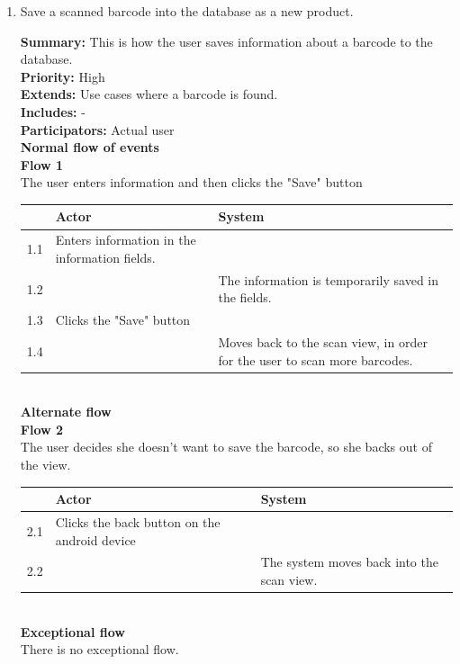 \documentclass{report}
\begin{document}
\begin{enumerate}
\pagebreak

  \item Save a scanned barcode into the database as a new product. \

    \textbf{Summary:} This is how the user saves information about a barcode to the database. \\
    \textbf{Priority:} High \\
    \textbf{Extends:} Use cases where a barcode is found. \\
    \textbf{Includes:} - \\
    \textbf{Participators:} Actual user \\
    \textbf{Normal flow of events} \\
    \textbf{Flow 1} \\ The user enters information and then clicks the "Save" button \\

    \begin{tabular}{ | l | p{4cm} | p{4cm} |}
    \hline
      & Actor & System \\ \hline
    1.1 & Enters information in the information fields. & \\ \hline
    1.2 & & The information is temporarily saved in the fields. \\ \hline
    1.3 & Clicks the "Save" button & \\ \hline
    1.4 & & Moves back to the scan view, in order for the user to scan more barcodes. \\
    \hline
    \end{tabular} \\

    \textbf{Alternate flow} \\
    \textbf{Flow 2} \\ The user decides she doesn't want to save the barcode, so she backs out of the view. \\

    \begin{tabular}{ | l | p{4cm} | p{4cm} |}
    \hline
      & Actor & System \\ \hline
    2.1 & Clicks the back button on the android device & \\
    2.2 & & The system moves back into the scan view. \\
    \hline
    \end{tabular} \\

    \textbf{Exceptional flow} \\ There is no exceptional flow.


\end{enumerate}
\end{document}
